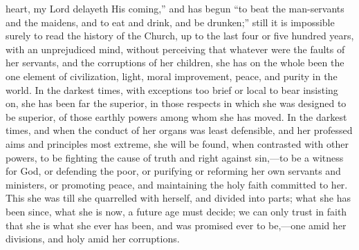 heart, my Lord delayeth His coming,'' and has begun ``to beat
the man-servants and the maidens, and to eat and drink, and be
drunken;'' still it is impossible surely to read the history of
the Church, up to the last four or five hundred years, with an
unprejudiced mind, without perceiving that whatever were the faults of
her servants, and the corruptions of her children, she has on the
whole been the one element of civilization, light, moral improvement,
peace, and purity in the world. In the darkest times, with exceptions
too brief or local to bear insisting on, she has been far the
superior, in those respects in which she was designed to be superior,
of those earthly powers among whom she has moved. In the darkest
times, and when the conduct of her organs was least defensible, and
her professed aims and principles most extreme, she will be found,
when contrasted with other powers, to be fighting the cause of truth
and right against sin,—to be a witness for God, or defending the
poor, or purifying or reforming her own servants and ministers, or
promoting peace, and maintaining the holy faith committed to her. This
she was till she quarrelled with herself, and divided into parts; what
she has been since, what she is now, a future age must decide; we can
only trust in faith that she is what she ever has been, and was
promised ever to be,—one amid her divisions, and holy amid her
corruptions.

